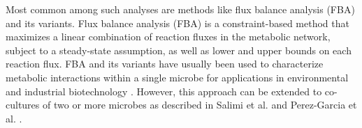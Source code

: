 

Most common among such analyses are methods like flux balance analysis (FBA) and its variants. Flux balance analysis (FBA) is a constraint-based method that maximizes a linear combination of reaction fluxes in the metabolic network, subject to a steady-state assumption, as well as lower and upper bounds on each reaction flux\cite{Orth10, Heirendt19}. FBA and its variants have usually been used to characterize metabolic interactions within a single microbe for applications in environmental and industrial biotechnology \cite{Garcia16}. However, this approach can be extended to co-cultures of two or more microbes as described in Salimi et al. \cite{Salimi10} and Perez-Garcia et al. \cite{Garcia16}.



